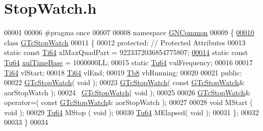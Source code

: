 \hypertarget{_stop_watch_8h_source}{}\section{Stop\+Watch.\+h}
\label{_stop_watch_8h_source}

\begin{DoxyCode}
00001 
00006 \textcolor{preprocessor}{#pragma once}
00007 
00008 \textcolor{keyword}{namespace }\mbox{\hyperlink{namespace_g_n_common}{GNCommon}}
00009 \{
\mbox{\hyperlink{class_g_n_common_1_1_g_tc_stop_watch}{00010}}    \textcolor{keyword}{class }\mbox{\hyperlink{class_g_n_common_1_1_g_tc_stop_watch}{GTcStopWatch}}
00011    \{
00012    \textcolor{keyword}{protected}:     \textcolor{comment}{// Protected Attributes}
00013       \textcolor{keyword}{static} \textcolor{keyword}{const} \mbox{\hyperlink{namespace_g_n_common_ad0a34f67eefe81cfbd0e515bba246d9d}{Ti64}} xlMaxQuadPart = 9223372036854775807;  
\mbox{\hyperlink{class_g_n_common_1_1_g_tc_stop_watch_a525b6eebced7d4d9c3812788cfde2b75}{00014}}       \textcolor{keyword}{static} \textcolor{keyword}{const} \mbox{\hyperlink{namespace_g_n_common_a9404ee6090c788ae70aebd1436ceb97d}{Tu64}} \mbox{\hyperlink{class_g_n_common_1_1_g_tc_stop_watch_a525b6eebced7d4d9c3812788cfde2b75}{xulTimeBase}}   = 1000000LL;            
00015       \textcolor{keyword}{static} \mbox{\hyperlink{namespace_g_n_common_a9404ee6090c788ae70aebd1436ceb97d}{Tu64}} vulFrequency;
00016 
00017       \mbox{\hyperlink{namespace_g_n_common_ad0a34f67eefe81cfbd0e515bba246d9d}{Ti64}} vlStart;
00018       \mbox{\hyperlink{namespace_g_n_common_ad0a34f67eefe81cfbd0e515bba246d9d}{Ti64}} vlEnd;
00019       \mbox{\hyperlink{namespace_g_n_common_a8115dc7ed53b6e5b52e6bfde1632ea74}{Tb8}}  vbRunning;
00020 
00021    \textcolor{keyword}{public}:
00022       \mbox{\hyperlink{class_g_n_common_1_1_g_tc_stop_watch}{GTcStopWatch}}( \textcolor{keywordtype}{void} );
00023       \mbox{\hyperlink{class_g_n_common_1_1_g_tc_stop_watch}{GTcStopWatch}}( \textcolor{keyword}{const} \mbox{\hyperlink{class_g_n_common_1_1_g_tc_stop_watch}{GTcStopWatch}}& aorStopWatch );
00024       ~\mbox{\hyperlink{class_g_n_common_1_1_g_tc_stop_watch}{GTcStopWatch}}( \textcolor{keywordtype}{void} );
00025 
00026       \mbox{\hyperlink{class_g_n_common_1_1_g_tc_stop_watch}{GTcStopWatch}}& operator=( \textcolor{keyword}{const} \mbox{\hyperlink{class_g_n_common_1_1_g_tc_stop_watch}{GTcStopWatch}}& aorStopWatch );
00027 
00028       \textcolor{keywordtype}{void}  MStart  ( \textcolor{keywordtype}{void} );
00029       \mbox{\hyperlink{namespace_g_n_common_a9404ee6090c788ae70aebd1436ceb97d}{Tu64}} MStop   ( \textcolor{keywordtype}{void} );
00030       \mbox{\hyperlink{namespace_g_n_common_a9404ee6090c788ae70aebd1436ceb97d}{Tu64}} MElapsed( \textcolor{keywordtype}{void} );
00031    \};
00032 
00033 \}
00034 
\end{DoxyCode}
